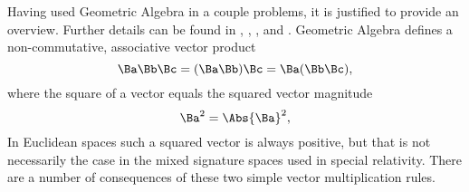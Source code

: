 %
%
%
Having used Geometric Algebra in a couple problems, it is justified to provide an overview.  Further details can be found in
\citep{dorst2007gac},
\citep{doran2003gap},
\citep{aMacdonaldVAGC},
and
\citep{hestenes1999nfc}.
%
Geometric Algebra defines a non-commutative, associative vector product
%
\begin{equation}\label{eqn:gaTutorial:20}
\Ba \Bb \Bc
=
(\Ba \Bb) \Bc
=
\Ba (\Bb \Bc),
\end{equation}
%
where the square of a vector equals the squared vector magnitude
%
\begin{dmath}\label{eqn:gaTutorial:40}
\Ba^2 = \Abs{\Ba}^2,
\end{dmath}
%
In Euclidean spaces such a squared vector is always positive, but that is not necessarily the case in the mixed signature spaces used in special relativity.
%
There are a number of consequences of these two simple vector multiplication rules.
%

